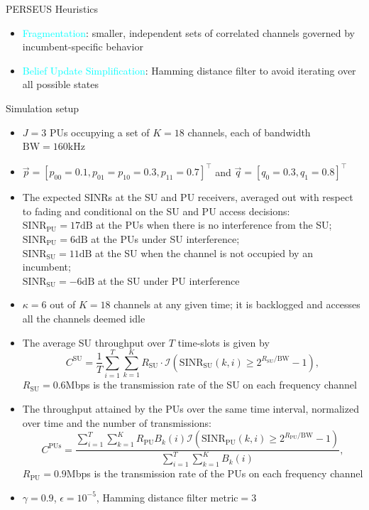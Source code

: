 \documentclass{beamer}
\begin{document}
\begin{frame}{PERSEUS Heuristics}
    \begin{itemize}
        \item \textcolor{cyan}{Fragmentation}: smaller, independent sets of correlated channels governed by incumbent-specific behavior
        \item \textcolor{cyan}{Belief Update Simplification}: Hamming distance filter to avoid iterating over all possible states
    \end{itemize}
\end{frame}
\begin{frame}{Simulation setup}
    \scriptsize{\begin{itemize}
        \item $J{=}3$ PUs occupying a set of $K{=}18$ channels, each of bandwidth $\text{BW}{=}160 \text{kHz}$
        \item $\vec{p}{=}[p_{00}{=}0.1,p_{01}{=}p_{10}{=}0.3,p_{11}{=}0.7]^\intercal$ and $\vec{q}{=}[q_{0}{=}0.3,q_{1}{=}0.8]^\intercal$
        \item The expected SINRs at the SU and PU receivers, averaged out with respect to fading and conditional on the SU and PU access decisions:
        \\$\text{SINR}_{\text{PU}}{=}17\text{dB}$ at the PUs when there is no interference from the SU; \\$\text{SINR}_{\text{PU}}{=}6\text{dB}$ at the PUs under SU interference; 
        \\$\text{SINR}_{\text{SU}}{=}11\text{dB}$ at the SU when the channel is not occupied by an incumbent;
        \\$\text{SINR}_{\text{SU}}{=}{-}6\text{dB}$ at the SU under PU interference
        \item $\kappa{=}6$ out of $K{=}18$ channels at any given time; it is backlogged and accesses all the channels deemed idle
        \item The average SU throughput over $T$ time-slots is given by 
        $$C^{\text{SU}} = \frac{1}{T}\sum_{i=1}^T \sum_{k=1}^{K} R_{\text{SU}} \cdot \mathcal{I}\left(\text{SINR}_{\text{SU}}(k,i) \geq 2^{R_{\text{SU}}/\text{BW}} - 1\right),$$ $R_{\text{SU}}{=}0.6$Mbps is the transmission rate of the SU on each frequency channel
        \item The throughput attained by the PUs over the same time interval, normalized over time and the number of transmissions:
        $$C^{\text{PUs}}{=}\frac{\sum_{i=1}^{T}\sum_{k=1}^{K}R_{\text{PU}}B_{k}(i)\mathcal{I}\left(\text{SINR}_{\text{PU}}(k,i){\geq}2^{R_{\text{PU}}/\text{BW}}{-}1\right)}{\sum_{i=1}^T\sum_{k=1}^{K}B_{k}(i)},$$
        $R_{\text{PU}}{=}0.9$Mbps is the transmission rate of the PUs on each frequency channel
        \item $\gamma{=}0.9$, $\epsilon{=}10^{-5}$, Hamming distance filter metric${=}3$
    \end{itemize}}
\end{frame}
\end{document}

